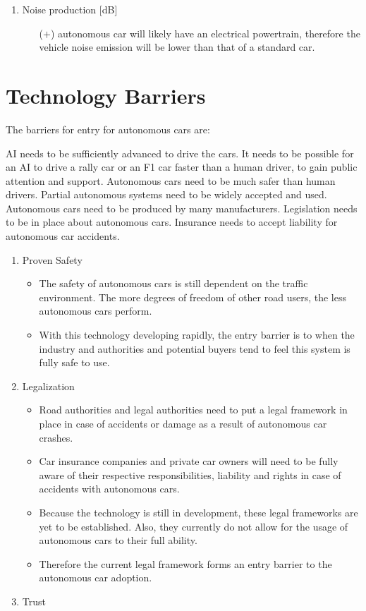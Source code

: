 \documentclass[a4paper]{article}
\begin{document}
\begin{enumerate}
\begin{enumerate}
    \end{enumerate}
\item Noise production [dB]
    \begin{enumerate}
    \item[($+$)] autonomous car will likely have an electrical powertrain, therefore the vehicle noise emission will be lower than that of a standard car.
    \end{enumerate}
\end{enumerate}

\section{Technology Barriers}
\label{sec:technology-barriers}

The barriers for entry for autonomous cars are:

AI needs to be sufficiently advanced to drive the cars.
It needs to be possible for an AI to drive a rally car or an F1 car faster than a human driver, to gain public attention and support.
Autonomous cars need to be much safer than human drivers.
Partial autonomous systems need to be widely accepted and used.
Autonomous cars need to be produced by many manufacturers.
Legislation needs to be in place about autonomous cars.
Insurance needs to accept liability for autonomous car accidents.

\begin{enumerate}
    \item Proven Safety
    \begin{itemize}
        \item The safety of autonomous cars is still dependent on the traffic environment. The more degrees of freedom of other road users, the less autonomous cars perform. 
        \item With this technology developing rapidly, the entry barrier is to when the industry and authorities and potential buyers tend to feel this system is fully safe to use.
    \end{itemize}
    \item Legalization
    \begin{itemize}
        \item Road authorities and legal authorities need to put a legal framework in place in case of accidents or damage as a result of autonomous car crashes. 
        \item Car insurance companies and private car owners will need to be fully aware of their respective responsibilities, liability and rights in case of accidents with autonomous cars.
        \item Because the technology is still in development, these legal frameworks are yet to be established. Also, they currently do not allow for the usage of autonomous cars to their full ability.
        \item Therefore the current legal framework forms an entry barrier to the autonomous car adoption.
    \end{itemize}
    \item Trust
 \end{enumerate}
\end{document}
